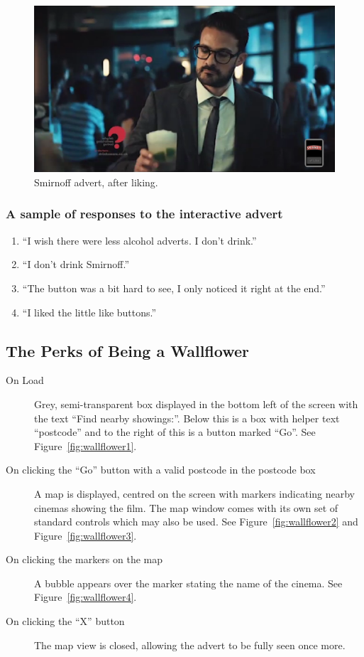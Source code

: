 	\begin{figure}[th]
		\centering
		\includegraphics[width=\textwidth,height=0.5\textheight,keepaspectratio]{images/adverts/smirnoff-2.png}
		\caption{Smirnoff advert, after liking.}
		\label{fig:smirnoff2}
	\end{figure}
	
	\subsubsection*{A sample of responses to the interactive advert}
	\begin{enumerate}
		\item{``I wish there were less alcohol adverts. I don't drink.''}
		\item{``I don't drink Smirnoff.''}
		\item{``The button was a bit hard to see, I only noticed it right at the end.''}
		\item{``I liked the little like buttons.''}
	\end{enumerate}

\clearpage
\subsection{The Perks of Being a Wallflower}
	\begin{description}
		\item[On Load]{Grey, semi-transparent box displayed in the bottom left of the screen with the text ``Find nearby showings:''. Below this is a box with helper text ``postcode'' and to the right of this is a button marked ``Go''. See Figure~\ref{fig:wallflower1}.}
		\item[On clicking the ``Go'' button with a valid postcode in the postcode box]{A map is displayed, centred on the screen with markers indicating nearby cinemas showing the film. The map window comes with its own set of standard controls which may also be used. See Figure~\ref{fig:wallflower2} and Figure~\ref{fig:wallflower3}.}
		\item[On clicking the markers on the map]{A bubble appears over the marker stating the name of the cinema. See Figure~\ref{fig:wallflower4}.}
		\item[On clicking the ``X'' button]{The map view is closed, allowing the advert to be fully seen once more.}
	\end{description}

